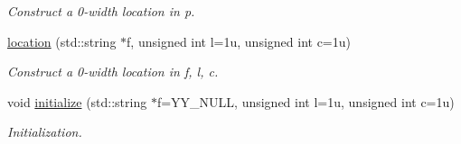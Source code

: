 \begin{DoxyCompactItemize}
\begin{DoxyCompactList}\small\item\em Construct a 0-\/width location in {\itshape p}. \end{DoxyCompactList}\item 
\hypertarget{classyy_1_1location_a75594362f84338b764164cd632ee7d9e}{\hyperlink{classyy_1_1location_a75594362f84338b764164cd632ee7d9e}{location} (std\-::string $\ast$f, unsigned int l=1u, unsigned int c=1u)}\label{classyy_1_1location_a75594362f84338b764164cd632ee7d9e}

\begin{DoxyCompactList}\small\item\em Construct a 0-\/width location in {\itshape f}, {\itshape l}, {\itshape c}. \end{DoxyCompactList}\item 
\hypertarget{classyy_1_1location_a0f7f01fcb693c6ea82f4b087d77fdb38}{void \hyperlink{classyy_1_1location_a0f7f01fcb693c6ea82f4b087d77fdb38}{initialize} (std\-::string $\ast$f=Y\-Y\-\_\-\-N\-U\-L\-L, unsigned int l=1u, unsigned int c=1u)}\label{classyy_1_1location_a0f7f01fcb693c6ea82f4b087d77fdb38}

\begin{DoxyCompactList}\small\item\em Initialization. \end{DoxyCompactList}\end{DoxyCompactItemize}
